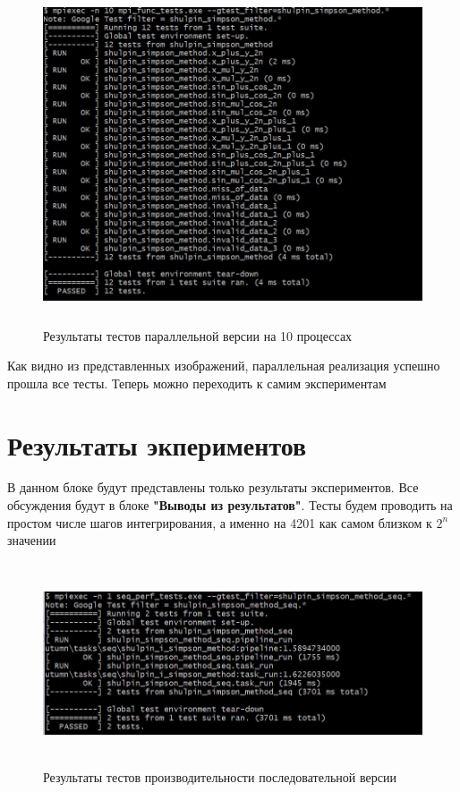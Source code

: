 \documentclass[12pt,a4paper]{article}
\begin{document}
\begin{figure}[H]
\centering
\includegraphics[height=10cm]{img/10nmpitest.jpg}
\caption{\label{fig:visualClass} Результаты тестов параллельной версии на 10 процессах}
\end{figure}

Как видно из представленных изображений, параллельная реализация успешно прошла все тесты. Теперь можно переходить к самим экспериментам

\section*{Результаты экпериментов}

В данном блоке будут представлены только результаты экспериментов. Все обсуждения будут в блоке \textbf{"Выводы из результатов"}. Тесты будем проводить на простом числе шагов интегрирования, а именно на 4201 как самом близком к \(2^n\) значении

\begin{figure}[H]
\centering
\includegraphics[height=6cm]{img/1nseqperftest.jpg}
\caption{\label{fig:visualClass} Результаты тестов производительности последовательной версии}
\end{figure}
\end{document}
